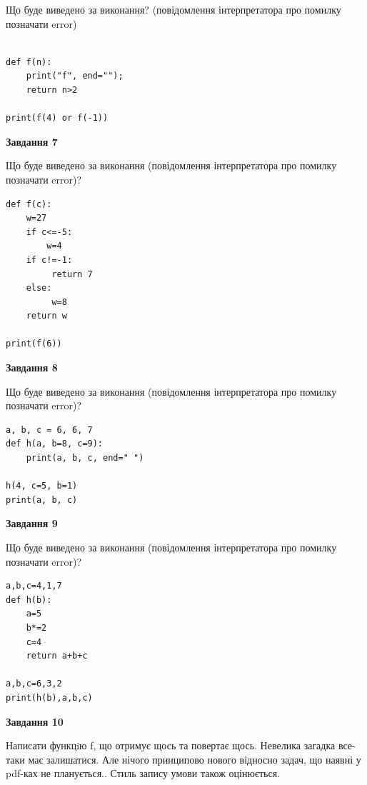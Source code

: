 \documentclass[12pt, ukrainian]{article}
\begin{document}
{\begin {large}
Що буде виведено за виконання? (повідомлення інтерпретатора про помилку позначати error)\par
\begin{verbatim}

def f(n):
    print("f", end="");
    return n>2

print(f(4) or f(-1))
\end{verbatim}

{\begin {center}\textbf{Завдання 7}\end {center}}

Що буде виведено за виконання (повідомлення інтерпретатора про помилку позначати error)?\par
\begin{verbatim}
def f(c):
    w=27
    if c<=-5: 
        w=4
    if c!=-1:
         return 7
    else:
         w=8
    return w

print(f(6))
\end{verbatim}

{\begin {center}\textbf{Завдання 8}\end {center}}

Що буде виведено за виконання (повідомлення інтерпретатора про помилку позначати error)?\par
\begin{verbatim}
a, b, c = 6, 6, 7
def h(a, b=8, c=9):
    print(a, b, c, end=" ")

h(4, c=5, b=1)
print(a, b, c)
\end{verbatim}

{\begin {center}\textbf{Завдання 9}\end {center}}

Що буде виведено за виконання (повідомлення інтерпретатора про помилку позначати error)?\par
\begin{verbatim}
a,b,c=4,1,7
def h(b):
    a=5
    b*=2
    c=4
    return a+b+c

a,b,c=6,3,2
print(h(b),a,b,c)
\end{verbatim}

{\begin {center}\textbf{Завдання 10}\end {center}}


Написати функцiю f, що отримує щось та повертає щось. Невелика загадка все-таки має залишатися. Але нічого принципово нового відносно задач, що наявні у pdf-ках не планується.. Стиль запису умови також оцінюється.\par
\end {large}}
\newpage
\end{document}
